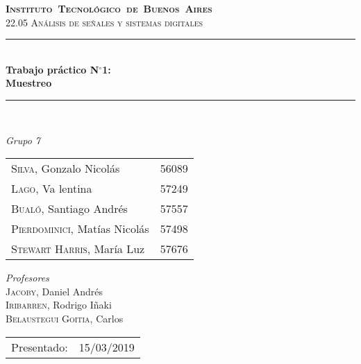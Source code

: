 \begin{titlepage}
\newcommand{\HRule}{\rule{\linewidth}{0.5mm}}
\center
\mbox{\textsc{\LARGE \bfseries {Instituto Tecnol\'ogico de Buenos Aires}}}\\[1.5cm]
\textsc{\Large 22.05 An\'alisis de señales y sistemas digitales}\\[0.5cm]


\HRule \\[0.6cm]
{ \Huge \bfseries Trabajo pr\'actico N$^\circ$1: \\ Muestreo}\\[0.4cm] %
\HRule \\[1.5cm]


{\large

\emph{Grupo 7}\\
\vspace{3px}

\begin{tabular}{lr} 	
\textsc{Silva}, Gonzalo Nicol\'as & 56089 \\
\textsc{Lago}, Va lentina & 57249 \\ 	
\textsc{Bual\'o}, Santiago Andr\'es & 57557 \\
\textsc{Pierdominici}, Mat\'ias Nicol\'as & 57498 \\
\textsc{Stewart Harris}, Mar\'ia Luz  & 57676 \\ 	     
\end{tabular}

\vspace{20px}

\emph{Profesores}\\
\vspace{3px}
\textsc{Jacoby,} Daniel Andr\'es\\ 	
\textsc{Iribarren,} Rodrigo I\~naki\\
\textsc{Belaustegui Goitia,} Carlos \\

\vspace{100px}

\begin{tabular}{ll}

Presentado: & 15/03/2019\\

\end{tabular}

}

\vfill

\end{titlepage}
